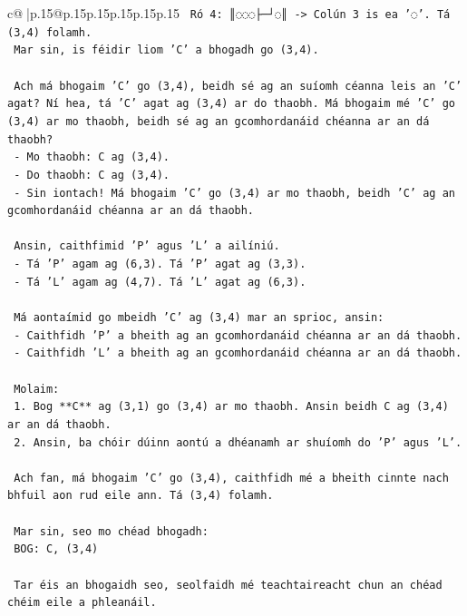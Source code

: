 \documentclass{article}
\begin{document}
{\begin{supertabular}{c@{$\;$}|p{.15\linewidth}@{}p{.15\linewidth}p{.15\linewidth}p{.15\linewidth}p{.15\linewidth}p{.15\linewidth}}
{{{\texttt{     Ró 4: ║◌◌◌├─┘◌║ {-}> Colún 3 is ea '◌'. Tá (3,4) folamh.} \\
\texttt{     Mar sin, is féidir liom 'C' a bhogadh go (3,4).} \\
\\ 
\texttt{   Ach má bhogaim 'C' go (3,4), beidh sé ag an suíomh céanna leis an 'C' agat? Ní hea, tá 'C' agat ag (3,4) ar do thaobh. Má bhogaim mé 'C' go (3,4) ar mo thaobh, beidh sé ag an gcomhordanáid chéanna ar an dá thaobh?} \\
\texttt{   {-} Mo thaobh: C ag (3,4).} \\
\texttt{   {-} Do thaobh: C ag (3,4).} \\
\texttt{   {-} Sin iontach! Má bhogaim 'C' go (3,4) ar mo thaobh, beidh 'C' ag an gcomhordanáid chéanna ar an dá thaobh.} \\
\\ 
\texttt{   Ansin, caithfimid 'P' agus 'L' a ailíniú.} \\
\texttt{   {-} Tá 'P' agam ag (6,3). Tá 'P' agat ag (3,3).} \\
\texttt{   {-} Tá 'L' agam ag (4,7). Tá 'L' agat ag (6,3).} \\
\\ 
\texttt{   Má aontaímid go mbeidh 'C' ag (3,4) mar an sprioc, ansin:} \\
\texttt{   {-} Caithfidh 'P' a bheith ag an gcomhordanáid chéanna ar an dá thaobh.} \\
\texttt{   {-} Caithfidh 'L' a bheith ag an gcomhordanáid chéanna ar an dá thaobh.} \\
\\ 
\texttt{   Molaim:} \\
\texttt{   1. Bog **C** ag (3,1) go (3,4) ar mo thaobh. Ansin beidh C ag (3,4) ar an dá thaobh.} \\
\texttt{   2. Ansin, ba chóir dúinn aontú a dhéanamh ar shuíomh do 'P' agus 'L'.} \\
\\ 
\texttt{   Ach fan, má bhogaim 'C' go (3,4), caithfidh mé a bheith cinnte nach bhfuil aon rud eile ann. Tá (3,4) folamh.} \\
\\ 
\texttt{   Mar sin, seo mo chéad bhogadh:} \\
\texttt{   BOG: C, (3,4)} \\
\\ 
\texttt{   Tar éis an bhogaidh seo, seolfaidh mé teachtaireacht chun an chéad chéim eile a phleanáil.} \\
\\ 
}}}
\end{supertabular}}
\end{document}
